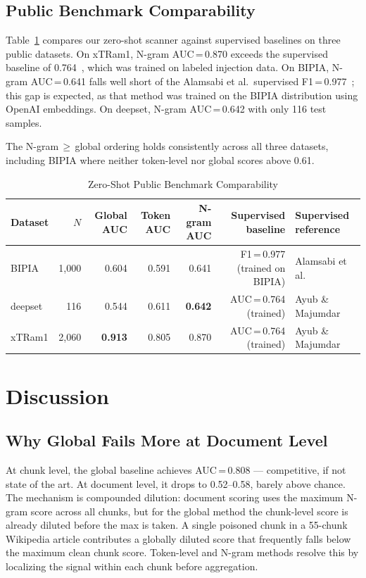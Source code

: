 \documentclass[conference]{IEEEtran}
\begin{document}
\subsection{Public Benchmark Comparability}

Table~\ref{tab:public} compares our zero-shot scanner against supervised baselines on
three public datasets. On xTRam1, N-gram AUC\,=\,0.870 exceeds the supervised
baseline of 0.764~\cite{ayub2024embedding}, which was trained on labeled injection
data. On BIPIA, N-gram AUC\,=\,0.641 falls well short of the Alamsabi et al.\
supervised F1\,=\,0.977~\cite{alamsabi2026context}; this gap is expected, as that
method was trained on the BIPIA distribution using OpenAI embeddings. On deepset,
N-gram AUC\,=\,0.642 with only 116 test samples.

The N-gram\,\(\geq\)\,global ordering holds consistently across all three datasets,
including BIPIA where neither token-level nor global scores above 0.61.

\begin{table}[t]
\caption{Zero-Shot Public Benchmark Comparability}
\label{tab:public}
\centering
\begin{tabular}{lrrrrrp{5.2cm}}
\toprule
Dataset & \(N\) & Global AUC & Token AUC & N-gram AUC & Supervised baseline & Supervised reference \\
\midrule
BIPIA & 1,000 & 0.604 & 0.591 & 0.641 & F1\,=\,0.977 (trained on BIPIA) & Alamsabi et al.~\cite{alamsabi2026context} \\
deepset & 116 & 0.544 & 0.611 & \textbf{0.642} & AUC\,=\,0.764 (trained) & Ayub \& Majumdar~\cite{ayub2024embedding} \\
xTRam1 & 2,060 & \textbf{0.913} & 0.805 & 0.870 & AUC\,=\,0.764 (trained) & Ayub \& Majumdar~\cite{ayub2024embedding} \\
\bottomrule
\end{tabular}
\end{table}

\section{Discussion}
\label{sec:discussion}

\subsection{Why Global Fails More at Document Level}

At chunk level, the global baseline achieves AUC\,=\,0.808 --- competitive, if not
state of the art. At document level, it drops to 0.52--0.58, barely above chance. The
mechanism is compounded dilution: document scoring uses the maximum N-gram score
across all chunks, but for the global method the chunk-level score is already diluted
before the max is taken. A single poisoned chunk in a 55-chunk Wikipedia article
contributes a globally diluted score that frequently falls below the maximum clean
chunk score. Token-level and N-gram methods resolve this by localizing the signal
within each chunk before aggregation.
\end{document}
